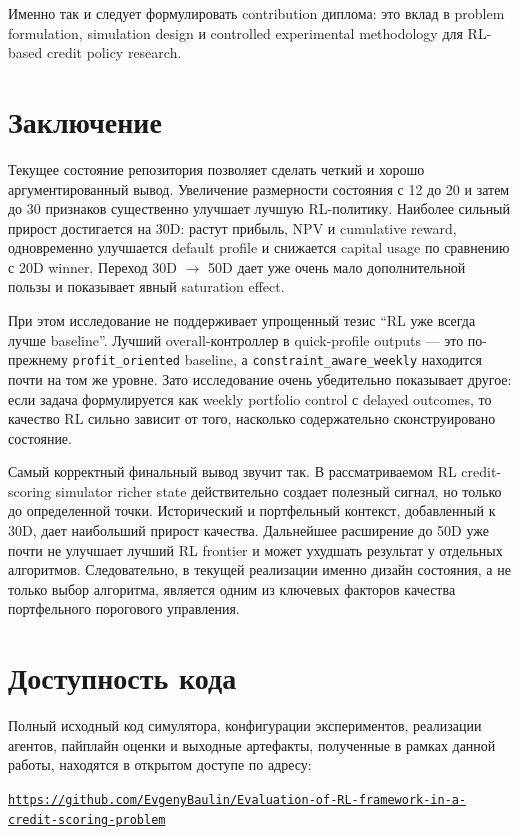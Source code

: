 \documentclass[12pt,a4paper]{article}
\begin{document}
Именно так и следует формулировать contribution диплома: это вклад в problem formulation, simulation design и controlled experimental methodology для RL-based credit policy research.

\section{Заключение}

Текущее состояние репозитория позволяет сделать четкий и хорошо аргументированный вывод. Увеличение размерности состояния с 12 до 20 и затем до 30 признаков существенно улучшает лучшую RL-политику. Наиболее сильный прирост достигается на 30D: растут прибыль, NPV и cumulative reward, одновременно улучшается default profile и снижается capital usage по сравнению с 20D winner. Переход 30D $\rightarrow$ 50D дает уже очень мало дополнительной пользы и показывает явный saturation effect.

При этом исследование не поддерживает упрощенный тезис ``RL уже всегда лучше baseline''. Лучший overall-контроллер в quick-profile outputs --- это по-прежнему \texttt{profit\_oriented} baseline, а \texttt{constraint\_aware\_weekly} находится почти на том же уровне. Зато исследование очень убедительно показывает другое: если задача формулируется как weekly portfolio control с delayed outcomes, то качество RL сильно зависит от того, насколько содержательно сконструировано состояние.

Самый корректный финальный вывод звучит так. В рассматриваемом RL credit-scoring simulator richer state действительно создает полезный сигнал, но только до определенной точки. Исторический и портфельный контекст, добавленный к 30D, дает наибольший прирост качества. Дальнейшее расширение до 50D уже почти не улучшает лучший RL frontier и может ухудшать результат у отдельных алгоритмов. Следовательно, в текущей реализации именно дизайн состояния, а не только выбор алгоритма, является одним из ключевых факторов качества портфельного порогового управления.

\section*{Доступность кода}

Полный исходный код симулятора, конфигурации экспериментов, реализации агентов, пайплайн оценки и выходные артефакты, полученные в рамках данной работы, находятся в открытом доступе по адресу:

\begin{center}
    \href{https://github.com/EvgenyBaulin/Evaluation-of-RL-framework-in-a-credit-scoring-problem}{%
    \texttt{https://github.com/EvgenyBaulin/Evaluation-of-RL-framework-in-a-credit-scoring-problem}}
\end{center}



\end{document}
